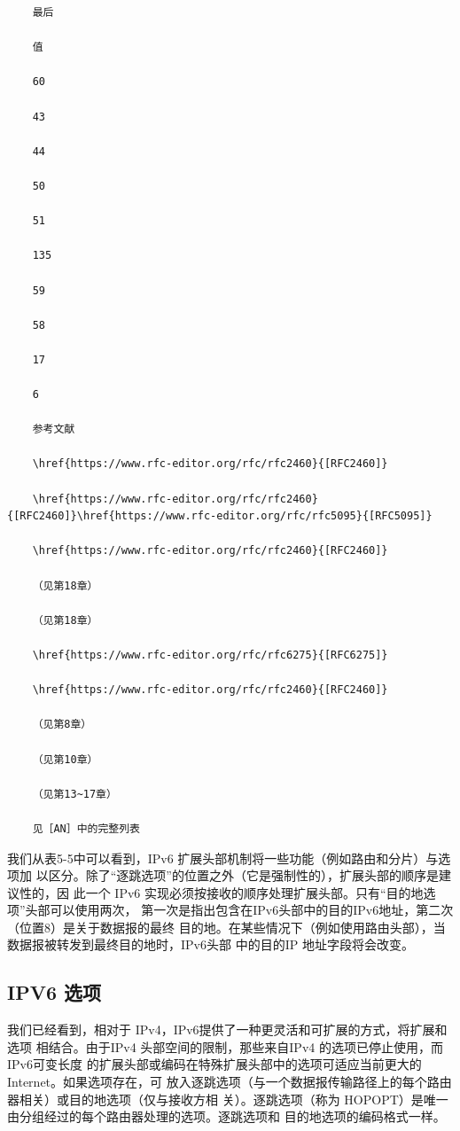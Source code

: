 \begin{verbatim}
    最后
    
    值
    
    60
    
    43
    
    44
    
    50
    
    51
    
    135
    
    59
    
    58
    
    17
    
    6
    
    参考文献
    
    \href{https://www.rfc-editor.org/rfc/rfc2460}{[RFC2460]}
    
    \href{https://www.rfc-editor.org/rfc/rfc2460}{[RFC2460]}\href{https://www.rfc-editor.org/rfc/rfc5095}{[RFC5095]}
    
    \href{https://www.rfc-editor.org/rfc/rfc2460}{[RFC2460]}
    
    （见第18章）
    
    （见第18章）
    
    \href{https://www.rfc-editor.org/rfc/rfc6275}{[RFC6275]}
    
    \href{https://www.rfc-editor.org/rfc/rfc2460}{[RFC2460]}
    
    （见第8章）
    
    （见第10章）
    
    （见第13~17章）
    
    见［AN］中的完整列表
\end{verbatim}

我们从表5-5中可以看到，IPv6 扩展头部机制将一些功能（例如路由和分片）与选项加
以区分。除了“逐跳选项”的位置之外（它是强制性的），扩展头部的顺序是建议性的，因
此一个 IPv6 实现必须按接收的顺序处理扩展头部。只有“目的地选项”头部可以使用两次，
第一次是指出包含在IPv6头部中的目的IPv6地址，第二次（位置8）是关于数据报的最终
目的地。在某些情况下（例如使用路由头部），当数据报被转发到最终目的地时，IPv6头部
中的目的IP 地址字段将会改变。

\subsection{IPV6 选项}

我们已经看到，相对于 IPv4，IPv6提供了一种更灵活和可扩展的方式，将扩展和选项
相结合。由于IPv4 头部空间的限制，那些来自IPv4 的选项已停止使用，而IPv6可变长度
的扩展头部或编码在特殊扩展头部中的选项可适应当前更大的 Internet。如果选项存在，可
放入逐跳选项（与一个数据报传输路径上的每个路由器相关）或目的地选项（仅与接收方相
关）。逐跳选项（称为 HOPOPT）是唯一由分组经过的每个路由器处理的选项。逐跳选项和
目的地选项的编码格式一样。

